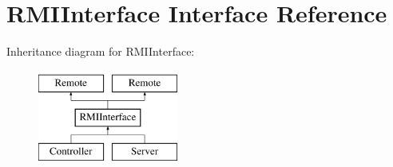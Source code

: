 \hypertarget{interface_r_m_i_interface}{}\section{R\+M\+I\+Interface Interface Reference}
\label{interface_r_m_i_interface}
Inheritance diagram for R\+M\+I\+Interface\+:\begin{figure}[H]
\begin{center}
\leavevmode
\includegraphics[height=3.000000cm]{interface_r_m_i_interface}
\end{center}
\end{figure}
